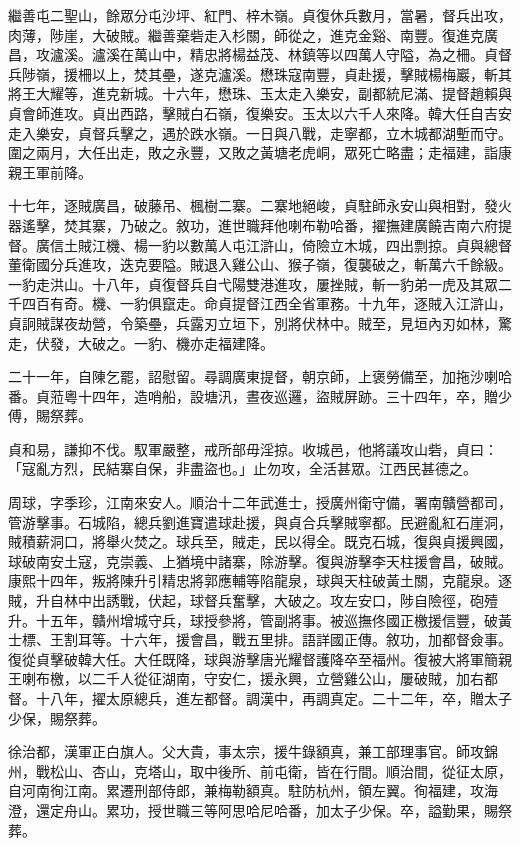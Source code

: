 \begin{pinyinscope}
繼善屯二聖山，餘眾分屯沙坪、紅門、梓木嶺。貞復休兵數月，當暑，督兵出攻，肉薄，陟崖，大破賊。繼善棄砦走入杉關，師從之，進克金谿、南豐。復進克廣昌，攻瀘溪。瀘溪在萬山中，精忠將楊益茂、林鎮等以四萬人守隘，為之柵。貞督兵陟嶺，援柵以上，焚其壘，遂克瀘溪。懋珠寇南豐，貞赴援，擊賊楊梅巖，斬其將王大耀等，進克新城。十六年，懋珠、玉太走入樂安，副都統尼滿、提督趙賴與貞會師進攻。貞出西路，擊賊白石嶺，復樂安。玉太以六千人來降。韓大任自吉安走入樂安，貞督兵擊之，遇於跌水嶺。一日與八戰，走寧都，立木城都湖塹而守。圍之兩月，大任出走，敗之永豐，又敗之黃塘老虎峒，眾死亡略盡；走福建，詣康親王軍前降。

十七年，逐賊廣昌，破藤吊、楓樹二寨。二寨地絕峻，貞駐師永安山與相對，發火器遙擊，焚其寨，乃破之。敘功，進世職拜他喇布勒哈番，擢撫建廣饒吉南六府提督。廣信土賊江機、楊一豹以數萬人屯江滸山，倚險立木城，四出剽掠。貞與總督董衛國分兵進攻，迭克要隘。賊退入雞公山、猴子嶺，復襲破之，斬萬六千餘級。一豹走洪山。十八年，貞復督兵自弋陽雙港進攻，屢挫賊，斬一豹弟一虎及其眾二千四百有奇。機、一豹俱竄走。命貞提督江西全省軍務。十九年，逐賊入江滸山，貞詗賊謀夜劫營，令築壘，兵露刃立垣下，別將伏林中。賊至，見垣內刃如林，驚走，伏發，大破之。一豹、機亦走福建降。

二十一年，自陳乞罷，詔慰留。尋調廣東提督，朝京師，上褒勞備至，加拖沙喇哈番。貞蒞粵十四年，造哨船，設塘汛，晝夜巡邏，盜賊屏跡。三十四年，卒，贈少傅，賜祭葬。

貞和易，謙抑不伐。馭軍嚴整，戒所部毋淫掠。收城邑，他將議攻山砦，貞曰：「寇亂方烈，民結寨自保，非盡盜也。」止勿攻，全活甚眾。江西民甚德之。

周球，字季珍，江南來安人。順治十二年武進士，授廣州衛守備，署南贛營都司，管游擊事。石城陷，總兵劉進寶遣球赴援，與貞合兵擊賊寧都。民避亂紅石崖洞，賊積薪洞口，將舉火焚之。球兵至，賊走，民以得全。既克石城，復與貞援興國，球破南安土寇，克崇義、上猶境中諸寨，除游擊。復與游擊李天柱援會昌，破賊。康熙十四年，叛將陳升引精忠將郭應輔等陷龍泉，球與天柱破黃土關，克龍泉。逐賊，升自林中出誘戰，伏起，球督兵奮擊，大破之。攻左安口，陟自險徑，砲殪升。十五年，贛州增城守兵，球授參將，管副將事。被巡撫佟國正檄援信豐，破黃士標、王割耳等。十六年，援會昌，戰五里排。語詳國正傳。敘功，加都督僉事。復從貞擊破韓大任。大任既降，球與游擊唐光耀督護降卒至福州。復被大將軍簡親王喇布檄，以二千人從征湖南，守安仁，援永興，立營雞公山，屢破賊，加右都督。十八年，擢太原總兵，進左都督。調漢中，再調真定。二十二年，卒，贈太子少保，賜祭葬。

徐治都，漢軍正白旗人。父大貴，事太宗，援牛錄額真，兼工部理事官。師攻錦州，戰松山、杏山，克塔山，取中後所、前屯衛，皆在行間。順治間，從征太原，自河南徇江南。累遷刑部侍郎，兼梅勒額真。駐防杭州，領左翼。徇福建，攻海澄，還定舟山。累功，授世職三等阿思哈尼哈番，加太子少保。卒，謚勤果，賜祭葬。


\end{pinyinscope}
